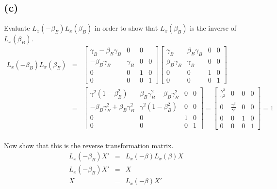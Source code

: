 \documentclass[11pt]{amsart}
\begin{document}
\subsection*{(c)} Evaluate $L_{x}(-\beta_{B})L_{x}(\beta_{B})$ in order to show that $L_{x}(\beta_{B})$ is the inverse of $L_{x}(\beta_{B})$. \\
\begin{eqnarray*} 
L_{x}(-\beta_{B})L_{x}(\beta_{B}) &=& \begin{bmatrix}
	\gamma_{B} -\beta_{B}\gamma_{B} & 0 & 0 \\
	-\beta_{B}\gamma_{B} & \gamma_{B} & 0 & 0 \\
	0 & 0 & 1 & 0 \\
	0 & 0 & 0 & 1 
	\end{bmatrix}\begin{bmatrix}
	\gamma_{B} & \beta_{B}\gamma_{B} & 0 & 0 \\
	\beta_{B}\gamma_{B} & \gamma_{B} & 0 & 0 \\
	0 & 0 & 1 & 0 \\
	0 & 0 & 0 & 1
	\end{bmatrix} \\
	&=& \begin{bmatrix}
	\gamma^{2}(1-\beta_{B}^{2}) & \beta_{B}\gamma_{B}^{2}-\beta_{B}\gamma_{B}^{2} & 0 & 0 \\
	-\beta_{B}\gamma_{B}^{2}+\beta_{B}\gamma_{B}^{2} & \gamma^{2}(1-\beta_{B}^{2}) & 0 & 0 \\
	0 & 0 & 1 & 0 \\
	0 & 0 & 0 & 1 
	\end{bmatrix} = \begin{bmatrix}
	\frac{\gamma^{2}}{\gamma^{2}} & 0 & 0 & 0 \\
	0 & \frac{\gamma^{2}}{\gamma^{2}} & 0 & 0 \\
	0 & 0 & 1 & 0 \\
	0 & 0 & 0 & 1 
	\end{bmatrix} = 1
\end{eqnarray*} \\
Now show that this is the reverse transformation matrix. \\
\begin{eqnarray*}
L_{x}(-\beta_{B})X' &=& L_{x}(-\beta)L_{x}(\beta)X \\
L_{x}(-\beta_{B})X'  &=& X \\
X &=& L_{x}(-\beta)X' 
\end{eqnarray*} \\
\end{document}
